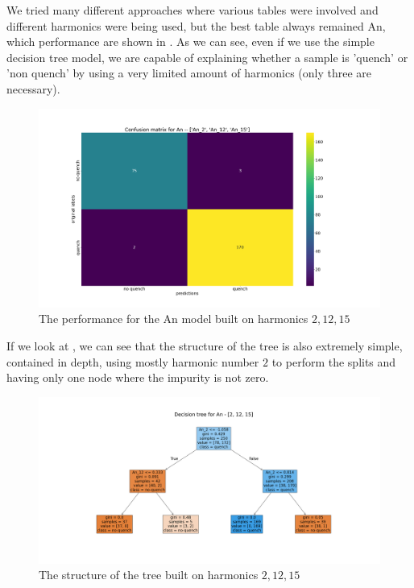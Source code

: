 We tried many different approaches where various tables were involved and different harmonics were
being used, but the best table always remained An, which performance are shown in
. As we can see, even if we use the simple decision tree model, we are
capable of explaining whether a sample is 'quench' or 'non quench' by using a very limited amount of
harmonics (only three are necessary).
\begin{figure}
	\centering
	\includegraphics[width=\linewidth]{img/An_2_12_15_cm_dt.png}
	\caption{The performance for the An model built on harmonics $2, 12, 15$} \label{fig:dt-an-2-12-15-perf}
\end{figure}
If we look at , we can see that the structure of the tree is also
extremely simple, contained in depth, using mostly harmonic number $2$ to perform the splits and
having only one node where the impurity is not zero.
\begin{figure}
	\centering
	\includegraphics[width=\linewidth]{img/An_2_12_15_pt_dt.png}
	\caption{The structure of the tree built on harmonics $2, 12, 15$} \label{fig:dt-an-2-12-15-pt}
\end{figure}



